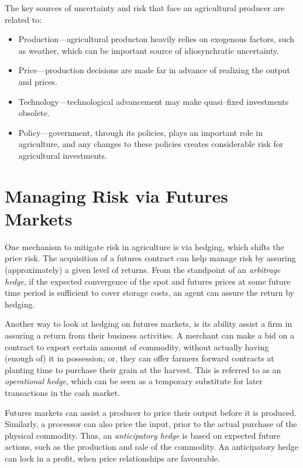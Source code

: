 \documentclass[
]{book}
\providecommand{\tightlist}{%
  \setlength{\itemsep}{0pt}\setlength{\parskip}{0pt}}
\begin{document}
The key sources of uncertainty and risk that face an agricultural producer are related to:

\begin{itemize}
\tightlist
\item
  Production---agricultural producton heavily relies on exogenous factors, such as weather, which can be important source of idiosynchratic uncertainty.
\item
  Price---production decisions are made far in advance of realizing the output and prices.
\item
  Technology---technological advancement may make quasi--fixed investments obsolete.
\item
  Policy---government, through its policies, plays an important role in agriculture, and any changes to these policies creates considerable risk for agricultural investments.
\end{itemize}

\hypertarget{managing-risk-via-futures-markets}{%
\section{Managing Risk via Futures Markets}\label{managing-risk-via-futures-markets}}

One mechanism to mitigate risk in agriculture is via hedging, which shifts the price risk. The acquisition of a futures contract can help manage risk by assuring (approximately) a given level of returns. From the standpoint of an \emph{arbitrage hedge}, if the expected convergence of the spot and futures prices at some future time period is sufficient to cover storage costs, an agent can assure the return by hedging.

Another way to look at hedging on futures markets, is its ability assist a firm in assuring a return from their business activities. A merchant can make a bid on a contract to export certain amount of commodity, without actually having (enough of) it in possession; or, they can offer farmers forward contracts at planting time to purchase their grain at the harvest. This is referred to as an \emph{operational hedge}, which can be seen as a temporary substitute for later transactions in the cash market.

Futures markets can assist a producer to price their output before it is produced. Similarly, a processor can also price the input, prior to the actual purchase of the physical commodity. Thus, an \emph{anticipatory hedge} is based on expected future actions, such as the production and sale of the commodity. An anticipatory hedge can lock in a profit, when price relationships are favourable.
\end{document}
